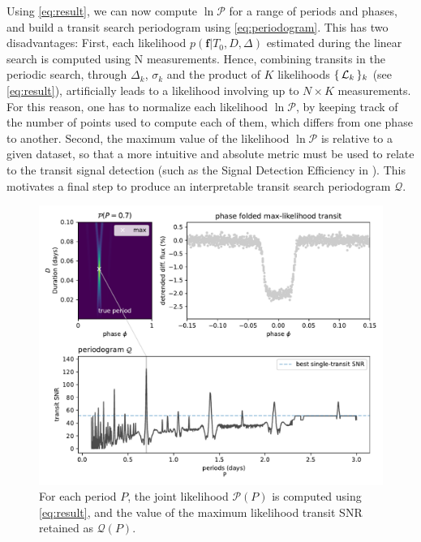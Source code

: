\documentclass[modern]{aastex631}
\begin{document}
Using \autoref{eq:result}, we can now compute $\ln\mathcal{P}$ for a range of periods and phases, and build a transit search periodogram using \autoref{eq:periodogram}. This has two disadvantages: First, each likelihood $p(\bm{f} \vert T_0, D, \Delta)$ estimated during the linear search is computed using N measurements. Hence, combining transits in the periodic search, through $\Delta_k$, $\sigma_k$ and the product of $K$ likelihoods $\{\,\mathcal{L}_k\,\}_k$ (see \autoref{eq:result}), artificially leads to a likelihood involving up to $N\times K$ measurements. For this reason, one has to normalize each likelihood $\ln\mathcal{P}$, by keeping track of the number of points used to compute each of them, which differs from one phase to another. Second, the maximum value of the likelihood $\ln\mathcal{P}$ is relative to a given dataset, so that a more intuitive and absolute metric must be used to relate to the transit signal detection (such as the Signal Detection Efficiency in \citealt{bls}). This motivates a final step to produce an interpretable transit search periodogram $\mathcal{Q}$. 
\begin{figure}[H]
    \begin{centering}
        \includegraphics[width=\linewidth]{./principle_Q.pdf}
        \caption{For each period $P$, the joint likelihood $\mathcal{P}(P)$ is computed using \autoref{eq:result}, and the value of the maximum likelihood transit SNR retained as $\mathcal{Q}(P)$. }
        \label{fig:periodogram}
    \end{centering}
\end{figure}
\end{document}
